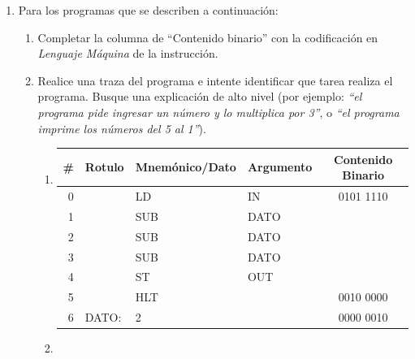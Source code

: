 \documentclass[12pt]{article}
\begin{document}
\begin{enumerate}

    \item Para los programas que se describen a continuación:

        \begin{enumerate}

            \item Completar la columna de ``Contenido binario'' con la
                codificación en \emph{Lenguaje Máquina} de la instrucción.

            \item Realice una traza del programa e intente identificar que
                tarea realiza el programa. Busque una explicación de alto
                nivel (por ejemplo: \emph{``el programa pide ingresar un
                número y lo multiplica por 3''}, o \emph{``el programa imprime
                los números del 5 al 1''}).

            \begin{enumerate}
            \itemsep2em \parskip0pt 

                \item \begin{tabular}{|r||l|l|l||c|}

                    \hline

                    \textbf{\#} & \textbf{Rotulo} & \textbf{Mnemónico/Dato} &
                    \textbf{Argumento} & \textbf{Contenido Binario}\\
                    \hline
                    \hline

                    0 & & LD & IN & 0101 1110\\ \hline
                    1 & & SUB & DATO & \\ \hline
                    2 & & SUB & DATO & \\ \hline
                    3 & & SUB & DATO & \\ \hline
                    4 & & ST & OUT & \\ \hline
                    5 & & HLT & & 0010 0000\\ \hline
                    6 & DATO: & 2 & & 0000 0010\\ \hline

                \end{tabular}

                \item \begin{tabular}{|r||l|l|l||c|}


\end{tabular}
\end{enumerate}
\end{enumerate}
\end{enumerate}
\end{document}
